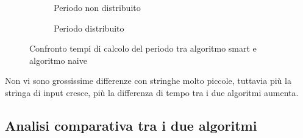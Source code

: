 \documentclass[a4paper,titlepage]{article}
\begin{document}
\begin{figure}[h]
  \centering
  \begin{subfigure}{\textwidth}
    \captionsetup{justification=centering}
     \caption{Periodo non distribuito}
     \label{fig:smart_naive_log}
  \end{subfigure}%
  \vspace{2pt}
  \begin{subfigure}{\textwidth}
    \captionsetup{justification=centering}
    \caption{Periodo distribuito}
     \label{fig:smart_naive_log_dist}
  \end{subfigure}
  \caption{Confronto tempi di calcolo del periodo tra algoritmo smart e algoritmo naive}
\end{figure}

Non vi sono grossissime differenze con stringhe molto piccole, tuttavia più la stringa di input cresce, più la differenza di tempo tra i due algoritmi aumenta.
\newpage

\subsection{Analisi comparativa tra i due algoritmi}
\end{document}
